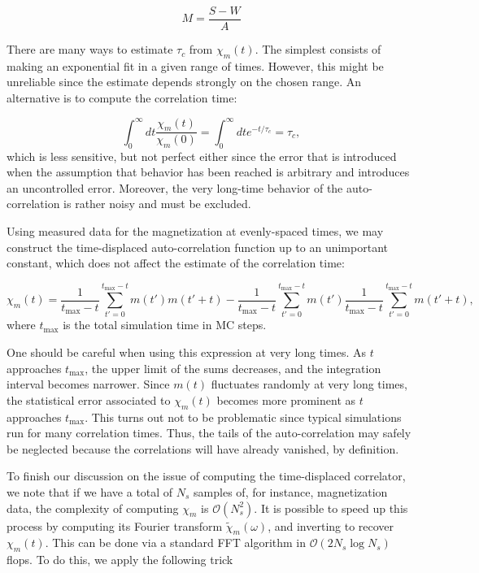 \begin{equation}\label{eq:nMeas}
M = \frac{S - W}{A}
\end{equation}

There are many ways to estimate $\tau_c$ from $\chi_m (t)$.
The simplest consists of making an exponential fit in a given range of times.
However, this might be unreliable since the estimate depends strongly on the chosen range.
An alternative is to compute the  correlation time:

\begin{equation}
\int_0^\infty dt \frac{\chi_m ( t ) }{\chi_m ( 0 ) } = \int_0^\infty dt e^{-t / \tau_c} = \tau_c  ,
\end{equation}
which is less sensitive, but not perfect either since the error that is introduced when the assumption  that  behavior has been reached is arbitrary and introduces an uncontrolled error.
Moreover, the very long-time behavior of the auto-correlation is rather noisy and must be excluded.

Using measured data for the magnetization at evenly-spaced times, we may construct the time-displaced auto-correlation function up to an unimportant constant, which does not affect the estimate of the correlation time:

\begin{equation}
\chi_m (t) = \frac{1}{ t_{\text{max}} - t } \sum_{t' = 0}^{t_{\text{max}} - t } m (t') m(t' + t) - \frac{1}{ t_{\text{max}} - t } \sum_{t' = 0}^{t_{\text{max}} - t } m (t') \frac{1}{ t_{\text{max}} - t } \sum_{t' = 0}^{t_{\text{max}} - t } m(t' + t) ,
\end{equation}
where $t_{\text{max}}$ is the total simulation time in MC steps.

One should be careful when using this expression at very long times.
As $t$ approaches $t_{\text{max}}$, the upper limit of the sums decreases, and the integration interval becomes narrower.
Since $m (t)$ fluctuates randomly at very long times, the statistical error associated to $\chi_m (t)$ becomes more prominent as $t$ approaches $t_{\text{max}}$.
This turns out not to be problematic since typical simulations run for many correlation times.
Thus, the tails of the auto-correlation may safely be neglected because the correlations will have already vanished, by definition.

To finish our discussion on the issue of computing the time-displaced correlator, we note that if we have a total of $N_s$ samples of, for instance, magnetization data, the complexity of computing $\chi_m$ is $\mathcal{O}(N_s^2)$.
It is possible to speed up this process by computing its Fourier transform $\tilde{\chi}_m(\omega)$, and inverting to recover $\chi_m (t)$.
This can be done via a standard \ac{FFT} algorithm in $\mathcal{O}(2 N_s \log N_s )$ flops.
To do this, we apply the following trick

